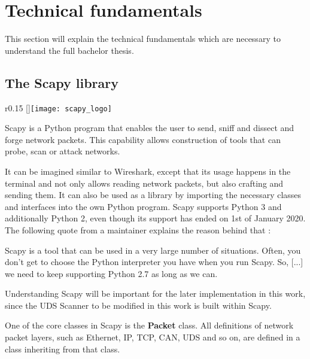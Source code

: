 \section{Technical fundamentals}

This section will explain the technical fundamentals which are necessary to understand the full bachelor thesis.

\subsection{The Scapy library}
\label{sec:scapy}

\begin{wrapfigure}{r}{0.15\textwidth}
    \raisebox{0pt}[\dimexpr{}\baselineskip\relax]{\texttt{[image: scapy\_logo]}}
\end{wrapfigure}

Scapy \cite{scapy} is a Python program that enables the user to send, sniff and dissect and forge network packets. This capability allows construction of tools that can probe, scan or attack networks.

It can be imagined similar to Wireshark, except that its usage happens in the terminal and not only allows reading network packets, but also crafting and sending them. It can also be used as a library by importing the necessary classes and interfaces into the own Python program. Scapy supports Python 3 and additionally Python 2, even though its support has ended on 1st of January 2020. The following quote from a maintainer explains the reason behind that \cite{scapy-py2}:

\begin{displayquote}
    Scapy is a tool that can be used in a very large number of situations. Often, you don't get to choose the Python interpreter you have when you run Scapy. So, [...] we need to keep supporting Python 2.7 as long as we can.
\end{displayquote}

Understanding Scapy will be important for the later implementation in this work, since the UDS Scanner to be modified in this work is built within Scapy.

One of the core classes in Scapy is the \textbf{Packet} class. All definitions of network packet layers, such as Ethernet, IP, TCP, CAN, UDS and so on, are defined in a class inheriting from that class.

